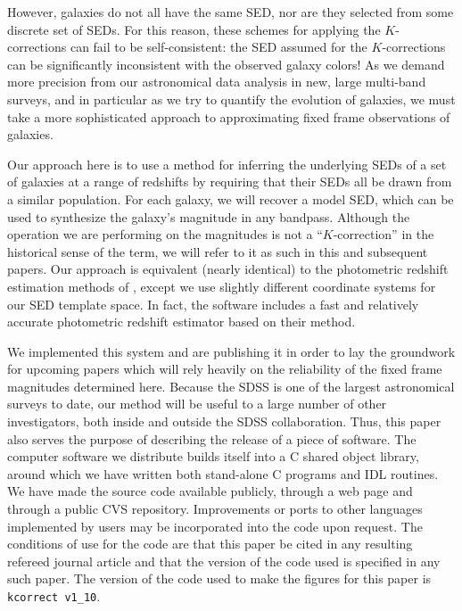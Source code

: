 \documentclass[10pt,preprint]{aastex}
\newcommand{\kversion}{{\tt v1\_10}}
\begin{document}
However, galaxies do not all have the same SED, nor are they selected
from some discrete set of SEDs. For this reason, these schemes for
applying the $K$-corrections can fail to be self-consistent: the SED
assumed for the $K$-corrections can be significantly inconsistent with
the observed galaxy colors! As we demand more precision from our
astronomical data analysis in new, large multi-band surveys, and in
particular as we try to quantify the evolution of galaxies, we must
take a more sophisticated approach to approximating fixed frame
observations of galaxies.

Our approach here is to use a method for inferring the underlying SEDs
of a set of galaxies at a range of redshifts by requiring that their
SEDs all be drawn from a similar population. For each galaxy, we will
recover a model SED, which can be used to synthesize the galaxy's
magnitude in any bandpass. Although the operation we are performing on
the magnitudes is not a ``$K$-correction'' in the historical sense of
the term, we will refer to it as such in this and subsequent
papers. Our approach is equivalent (nearly identical) to the
photometric redshift estimation methods of \citet{csabai00a},
except we use slightly different coordinate systems for our SED
template space. In fact, the software includes a fast and relatively
accurate photometric redshift estimator based on their method.

We implemented this system and are publishing it in order to lay the
groundwork for upcoming papers which will rely heavily on the
reliability of the fixed frame magnitudes determined here.  Because
the SDSS is one of the largest astronomical surveys to date, our
method will be useful to a large number of other investigators, both
inside and outside the SDSS collaboration.  Thus, this paper also
serves the purpose of describing the release of a piece of
software. The computer software we distribute builds itself into a C
shared object library, around which we have written both stand-alone C
programs and IDL routines. We have made the source code available
publicly, through a web page and through a public CVS
repository. Improvements or ports to other languages implemented by
users may be incorporated into the code upon request. The conditions
of use for the code are that this paper be cited in any resulting
refereed journal article and that the version of the code used is
specified in any such paper. The version of the code used to make the
figures for this paper is {\tt kcorrect \kversion}.
\end{document}
